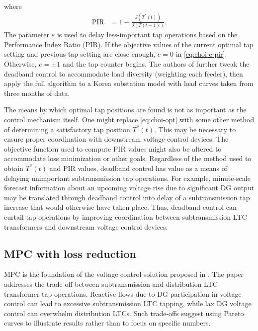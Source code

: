 \documentclass[10pt,letterpaper]{article}
\begin{document}
where
\begin{align*}
\text{PIR} &= 1 - \frac{J(T^*(t))}{J(T(t-1))}.
\end{align*}
The parameter $\varepsilon$ is used to delay less-important tap operations based on the Performance Index Ratio (PIR). If the objective values of the current optimal tap setting and previous tap setting are close enough, $e = 0$ in \eqref{eq:choi-e-pir}. Otherwise, $e=\pm1$ and the tap counter begins. The authors of \cite{choi2009} further tweak the deadband control to accommodate load diversity (weighting each feeder), then apply the full algorithm to a Korea substation model with load curves taken from three months of data.

The means by which optimal tap positions are found is not as important as the control mechanism itself. One might replace \eqref{eq:choi-opt} with some other method of determining a satisfactory tap position $T^*(t)$. This may be necessary to ensure proper coordination with downstream voltage control devices. The objective function used to compute PIR values might also be altered to accommodate loss minimization or other goals. Regardless of the method used to obtain $T^*(t)$ and PIR values, deadband control has value as a means of delaying unimportant subtransmission tap operations. For example, minute-scale forecast information about an upcoming voltage rise due to significant DG output may be translated through deadband control into delay of a subtransmission tap increase that would otherwise have taken place. Thus, deadband control can curtail tap operations by improving coordination between subtransmission LTC transformers and downstream voltage control devices.

\subsection{MPC with loss reduction}
MPC is the foundation of the voltage control solution proposed in \cite{baghsorkhi2015}. The paper addresses the trade-off between subtransmission and distribution LTC transformer tap operations. Reactive flows due to DG participation in voltage control can lead to excessive subtransmission LTC tapping, while lax DG voltage control can overwhelm distribution LTCs. Such trade-offs suggest using Pareto curves to illustrate results rather than to focus on specific numbers.
\end{document}
